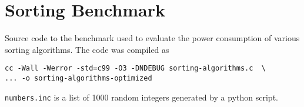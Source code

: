 \chapter{Sorting Benchmark}

\label{AppendixB}


Source code to the benchmark used to evaluate the power consumption of
various sorting algorithms.  The code was compiled as

\begin{verbatim}
cc -Wall -Werror -std=c99 -O3 -DNDEBUG sorting-algorithms.c  \
... -o sorting-algorithms-optimized
\end{verbatim}

\texttt{numbers.inc} is a list of 1000 random integers generated by a
python script.

\inputminted[linenos, frame=lines]{c}{source/sorting-algorithms.c}
\setstretch{1.5}
